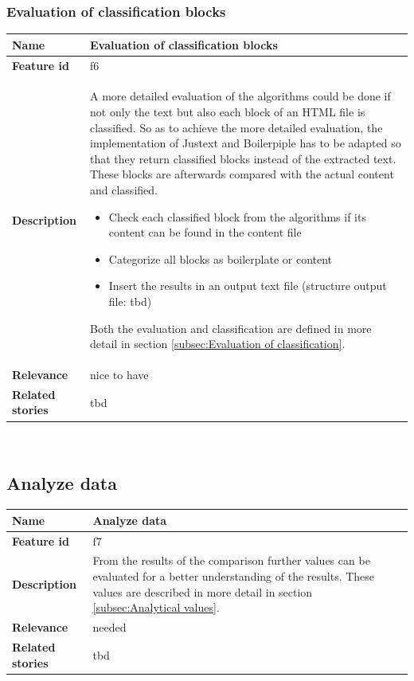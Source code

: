 \subsubsection{Evaluation of classification blocks}
\label{subsec:Evaluation of classification blocks}

	\begin{tabular}{ | p{3cm} | p{12cm} |}
	\hline
	\textbf{Name} 				& Evaluation of classification blocks \\ \hline
	\textbf{Feature id} 		& f6 \\ \hline
	\textbf{Description} 		& A more detailed evaluation of the algorithms could be done if not only the text but also each block of an HTML file is classified. So as to achieve the more detailed evaluation, the implementation of Justext and Boilerpiple has to be adapted so that they return classified blocks instead of the extracted text. These blocks are afterwards compared with the actual content and classified. 
								\begin{itemize}
							        \item Check each classified block from the algorithms if its content can be found in the content file
							        \item Categorize all blocks as boilerplate or content
							        \item Insert the results in an output text file (structure output file: tbd)
						        \end{itemize} 
	Both the evaluation and classification are defined in more detail in section \ref{subsec:Evaluation of classification}.
	\\ \hline
	\textbf{Relevance} 			& nice to have\\ \hline
	\textbf{Related stories} 	& tbd \\ \hline
	\end{tabular} \\





\subsection{Analyze data}
\label{subsec:Analyze data}

	\begin{tabular}{ | p{3cm} | p{12cm} |}
	\hline
	\textbf{Name} 				& Analyze data \\ \hline
	\textbf{Feature id} 		& f7 \\ \hline
	\textbf{Description} 		&  From the results of the comparison further values can be evaluated for a better understanding of the results. These values are described in more detail in section \ref{subsec:Analytical values}.
								    \\ \hline
	\textbf{Relevance} 			& needed \\ \hline
	\textbf{Related stories} 	& tbd \\ \hline
	\end{tabular} \\

